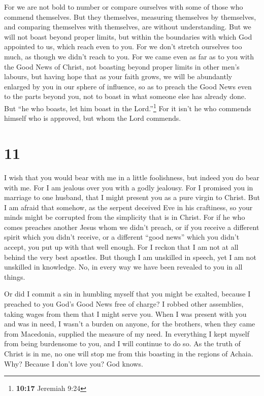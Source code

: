  For we are not bold to number or compare ourselves with
some of those who commend themselves. But they themselves, measuring
themselves by themselves, and comparing themselves with themselves, are
without understanding.  But we will not boast beyond
proper limits, but within the boundaries with which God appointed to us,
which reach even to you.  For we don't stretch ourselves
too much, as though we didn't reach to you. For we came even as far as
to you with the Good News of Christ,  not boasting beyond
proper limits in other men's labours, but having hope that as your faith
grows, we will be abundantly enlarged by you in our sphere of influence,
 so as to preach the Good News even to the parts beyond
you, not to boast in what someone else has already done. 
But ``he who boasts, let him boast in the Lord.''\footnote{\textbf{10:17}
  Jeremiah 9:24}  For it isn't he who commends himself
who is approved, but whom the Lord commends.

\hypertarget{section-10}{%
\section{11}\label{section-10}}

 I wish that you would bear with me in a little
foolishness, but indeed you do bear with me.  For I am
jealous over you with a godly jealousy. For I promised you in marriage
to one husband, that I might present you as a pure virgin to Christ.
 But I am afraid that somehow, as the serpent deceived Eve
in his craftiness, so your minds might be corrupted from the simplicity
that is in Christ.  For if he who comes preaches another
Jesus whom we didn't preach, or if you receive a different spirit which
you didn't receive, or a different ``good news'' which you didn't
accept, you put up with that well enough.  For I reckon
that I am not at all behind the very best apostles.  But
though I am unskilled in speech, yet I am not unskilled in knowledge.
No, in every way we have been revealed to you in all things.

 Or did I commit a sin in humbling myself that you might
be exalted, because I preached to you God's Good News free of charge?
 I robbed other assemblies, taking wages from them that I
might serve you.  When I was present with you and was in
need, I wasn't a burden on anyone, for the brothers, when they came from
Macedonia, supplied the measure of my need. In everything I kept myself
from being burdensome to you, and I will continue to do so.
 As the truth of Christ is in me, no one will stop me
from this boasting in the regions of Achaia.  Why?
Because I don't love you? God knows.

